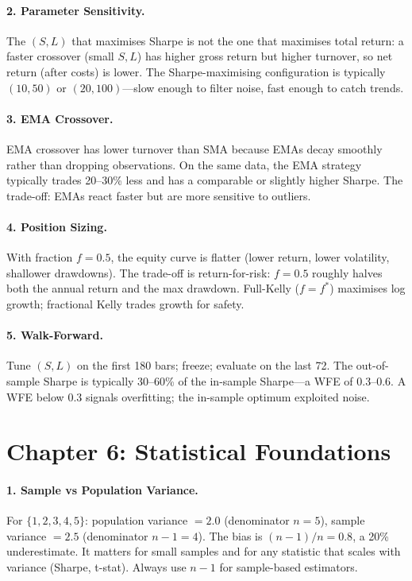 \paragraph{2. Parameter Sensitivity.}
The $(S, L)$ that maximises Sharpe is not the one that maximises
total return: a faster crossover (small $S, L$) has higher gross
return but higher turnover, so net return (after costs) is lower.
The Sharpe-maximising configuration is typically $(10, 50)$ or
$(20, 100)$---slow enough to filter noise, fast enough to catch
trends.

\paragraph{3. EMA Crossover.}
EMA crossover has lower turnover than SMA because EMAs decay
smoothly rather than dropping observations. On the same data, the
EMA strategy typically trades 20--30\% less and has a comparable or
slightly higher Sharpe. The trade-off: EMAs react faster but are
more sensitive to outliers.

\paragraph{4. Position Sizing.}
With fraction $f = 0.5$, the equity curve is flatter (lower return,
lower volatility, shallower drawdowns). The trade-off is
return-for-risk: $f = 0.5$ roughly halves both the annual return
and the max drawdown. Full-Kelly ($f = f^*$) maximises log growth;
fractional Kelly trades growth for safety.

\paragraph{5. Walk-Forward.}
Tune $(S, L)$ on the first 180 bars; freeze; evaluate on the last
72. The out-of-sample Sharpe is typically 30--60\% of the in-sample
Sharpe---a WFE of 0.3--0.6. A WFE below 0.3 signals overfitting; the
in-sample optimum exploited noise.

\section*{Chapter 6: Statistical Foundations}

\paragraph{1. Sample vs Population Variance.}
For $\{1,2,3,4,5\}$: population variance $= 2.0$ (denominator $n=5$),
sample variance $= 2.5$ (denominator $n-1=4$). The bias is
$(n-1)/n = 0.8$, a 20\% underestimate. It matters for small samples
and for any statistic that scales with variance (Sharpe, t-stat).
Always use $n-1$ for sample-based estimators.

